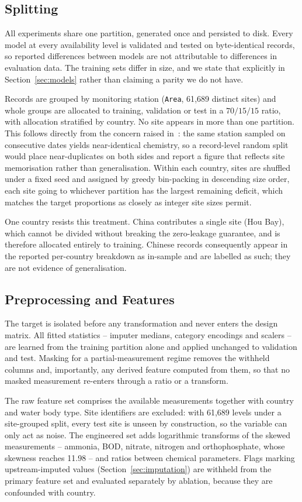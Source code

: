 \subsection{Splitting}
\label{sec:split}
All experiments share one partition, generated once and persisted to disk. Every model at
every availability level is validated and tested on byte-identical records, so reported
differences between models are not attributable to differences in evaluation data. The
training sets differ in size, and we state that explicitly in Section~\ref{sec:models}
rather than claiming a parity we do not have.

Records are grouped by monitoring station (\texttt{Area}, 61{,}689 distinct sites) and
whole groups are allocated to training, validation or test in a $70/15/15$ ratio, with
allocation stratified by country. No site appears in more than one partition. This
follows directly from the concern raised in~\cite{roberts2017cv}: the same station
sampled on consecutive dates yields near-identical chemistry, so a record-level random
split would place near-duplicates on both sides and report a figure that reflects site
memorisation rather than generalisation. Within each country, sites are shuffled under a
fixed seed and assigned by greedy bin-packing in descending size order, each site going
to whichever partition has the largest remaining deficit, which matches the target
proportions as closely as integer site sizes permit.

One country resists this treatment. China contributes a single site (Hou Bay), which
cannot be divided without breaking the zero-leakage guarantee, and is therefore allocated
entirely to training. Chinese records consequently appear in the reported per-country
breakdown as in-sample and are labelled as such; they are not evidence of generalisation.

\subsection{Preprocessing and Features}
The target is isolated before any transformation and never enters the design matrix. All
fitted statistics -- imputer medians, category encodings and scalers -- are learned from
the training partition alone and applied unchanged to validation and test. Masking for a
partial-measurement regime removes the withheld columns and, importantly, any derived
feature computed from them, so that no masked measurement re-enters through a ratio or a
transform.

The raw feature set comprises the available measurements together with country and water
body type. Site identifiers are excluded: with 61{,}689 levels under a site-grouped
split, every test site is unseen by construction, so the variable can only act as noise.
The engineered set adds logarithmic transforms of the skewed measurements -- ammonia,
BOD, nitrate, nitrogen and orthophosphate, whose skewness reaches 11.98 -- and ratios
between chemical parameters. Flags marking upstream-imputed values
(Section~\ref{sec:imputation}) are withheld from the primary feature set and evaluated
separately by ablation, because they are confounded with country.

